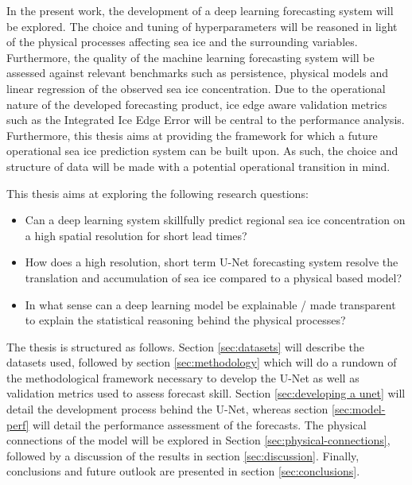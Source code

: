 \documentclass[../main/thesis.tex]{subfiles}
\begin{document}
In the present work, the development of a deep learning forecasting system will be explored. The choice and tuning of hyperparameters will be reasoned in light of the physical processes affecting sea ice and the surrounding variables. Furthermore, the quality of the machine learning forecasting system will be assessed against relevant benchmarks such as persistence, physical models and linear regression of the observed sea ice concentration. Due to the operational nature of the developed forecasting product, ice edge aware validation metrics such as the Integrated Ice Edge Error \citep{Goessling2016} will be central to the performance analysis. Furthermore, this thesis aims at providing the framework for which a future operational sea ice prediction system can be built upon. As such, the choice and structure of data will be made with a potential operational transition in mind.

This thesis aims at exploring the following research questions: 
\begin{itemize}
    \item Can a deep learning system skillfully predict regional sea ice concentration on a high spatial resolution for short lead times?
    \item How does a high resolution, short term U-Net forecasting system resolve the translation and accumulation of sea ice compared to a physical based model?
    \item In what sense can a deep learning model be explainable / made transparent to explain the statistical reasoning behind the physical processes?
\end{itemize}

The thesis is structured as follows. Section \ref{sec:datasets} will describe the datasets used, followed by section \ref{sec:methodology} which will do a rundown of the methodological framework necessary to develop the U-Net as well as validation metrics used to assess forecast skill. Section \ref{sec:developing a unet} will detail the development process behind the U-Net, whereas section \ref{sec:model-perf} will detail the performance assessment of the forecasts. The physical connections of the model will be explored in Section \ref{sec:physical-connections}, followed by a discussion of the results in section \ref{sec:discussion}. Finally, conclusions and future outlook are presented in section \ref{sec:conclusions}.

\biblio
\end{document}
